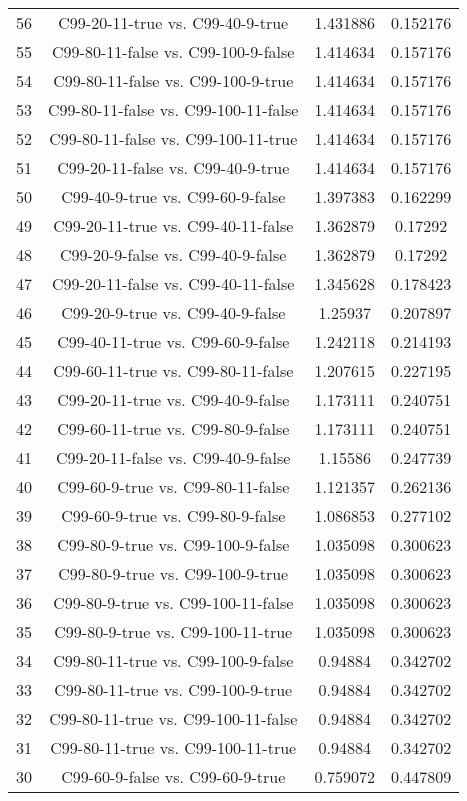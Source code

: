 \documentclass[a4paper,10pt]{article}
\begin{document}
\begin{landscape}
\begin{table}[!htp]
\begin{tabular}{cccc}
56&C99-20-11-true vs. C99-40-9-true&1.431886&0.152176\\
55&C99-80-11-false vs. C99-100-9-false&1.414634&0.157176\\
54&C99-80-11-false vs. C99-100-9-true&1.414634&0.157176\\
53&C99-80-11-false vs. C99-100-11-false&1.414634&0.157176\\
52&C99-80-11-false vs. C99-100-11-true&1.414634&0.157176\\
51&C99-20-11-false vs. C99-40-9-true&1.414634&0.157176\\
50&C99-40-9-true vs. C99-60-9-false&1.397383&0.162299\\
49&C99-20-11-true vs. C99-40-11-false&1.362879&0.17292\\
48&C99-20-9-false vs. C99-40-9-false&1.362879&0.17292\\
47&C99-20-11-false vs. C99-40-11-false&1.345628&0.178423\\
46&C99-20-9-true vs. C99-40-9-false&1.25937&0.207897\\
45&C99-40-11-true vs. C99-60-9-false&1.242118&0.214193\\
44&C99-60-11-true vs. C99-80-11-false&1.207615&0.227195\\
43&C99-20-11-true vs. C99-40-9-false&1.173111&0.240751\\
42&C99-60-11-true vs. C99-80-9-false&1.173111&0.240751\\
41&C99-20-11-false vs. C99-40-9-false&1.15586&0.247739\\
40&C99-60-9-true vs. C99-80-11-false&1.121357&0.262136\\
39&C99-60-9-true vs. C99-80-9-false&1.086853&0.277102\\
38&C99-80-9-true vs. C99-100-9-false&1.035098&0.300623\\
37&C99-80-9-true vs. C99-100-9-true&1.035098&0.300623\\
36&C99-80-9-true vs. C99-100-11-false&1.035098&0.300623\\
35&C99-80-9-true vs. C99-100-11-true&1.035098&0.300623\\
34&C99-80-11-true vs. C99-100-9-false&0.94884&0.342702\\
33&C99-80-11-true vs. C99-100-9-true&0.94884&0.342702\\
32&C99-80-11-true vs. C99-100-11-false&0.94884&0.342702\\
31&C99-80-11-true vs. C99-100-11-true&0.94884&0.342702\\
30&C99-60-9-false vs. C99-60-9-true&0.759072&0.447809\\

\end{tabular}
\end{table}
\end{landscape}
\end{document}
